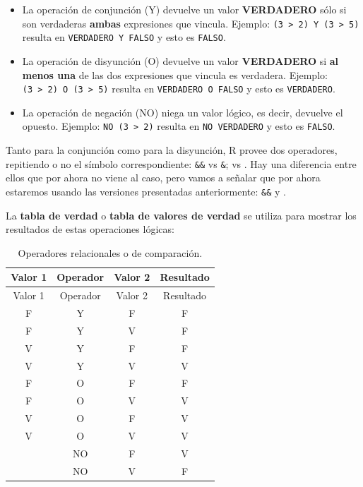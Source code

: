 \documentclass[
]{book}
\providecommand{\tightlist}{%
  \setlength{\itemsep}{0pt}\setlength{\parskip}{0pt}}
\begin{document}
\begin{itemize}
\tightlist
\item
  La operación de conjunción (Y) devuelve un valor \textbf{VERDADERO} sólo si son verdaderas \textbf{ambas} expresiones que vincula. Ejemplo: \texttt{(3\ \textgreater{}\ 2)\ Y\ (3\ \textgreater{}\ 5)} resulta en \texttt{VERDADERO\ Y\ FALSO} y esto es \texttt{FALSO}.
\item
  La operación de disyunción (O) devuelve un valor \textbf{VERDADERO} si \textbf{al menos una} de las dos expresiones que vincula es verdadera. Ejemplo: \texttt{(3\ \textgreater{}\ 2)\ O\ (3\ \textgreater{}\ 5)} resulta en \texttt{VERDADERO\ O\ FALSO} y esto es \texttt{VERDADERO}.
\item
  La operación de negación (NO) niega un valor lógico, es decir, devuelve el opuesto. Ejemplo: \texttt{NO\ (3\ \textgreater{}\ 2)} resulta en \texttt{NO\ VERDADERO} y esto es \texttt{FALSO}.
\end{itemize}

Tanto para la conjunción como para la disyunción, R provee dos operadores, repitiendo o no el símbolo correspondiente: \texttt{\&\&} vs \texttt{\&}; \texttt{\textbar{}\textbar{}} vs \texttt{\textbar{}}. Hay una diferencia entre ellos que por ahora no viene al caso, pero vamos a señalar que por ahora estaremos usando las versiones presentadas anteriormente: \texttt{\&\&} y \texttt{\textbar{}\textbar{}}.

La \textbf{tabla de verdad} o \textbf{tabla de valores de verdad} se utiliza para mostrar los resultados de estas operaciones lógicas:

\begin{longtable}[]{@{}cccc@{}}
\caption{\label{tab:verdad} Operadores relacionales o de comparación.}\tabularnewline
\toprule()
Valor 1 & Operador & Valor 2 & Resultado \\
\midrule()
\endfirsthead
\toprule()
Valor 1 & Operador & Valor 2 & Resultado \\
\midrule()
\endhead
F & Y & F & F \\
F & Y & V & F \\
V & Y & F & F \\
V & Y & V & V \\
F & O & F & F \\
F & O & V & V \\
V & O & F & V \\
V & O & V & V \\
& NO & F & V \\
& NO & V & F \\
\bottomrule()
\end{longtable}
\end{document}
